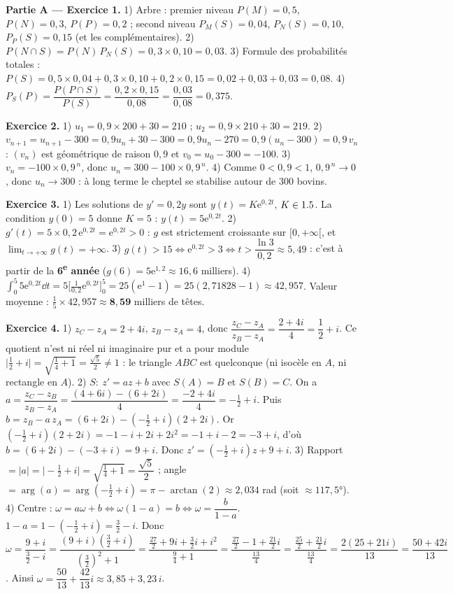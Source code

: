 
\noindent\textbf{Partie A — Exercice 1.}
1) Arbre : premier niveau $P(M)=0{,}5$, $P(N)=0{,}3$, $P(P)=0{,}2$ ; second niveau
$P_M(S)=0{,}04$, $P_N(S)=0{,}10$, $P_P(S)=0{,}15$ (et les complémentaires).
2) $P(N\cap S)=P(N)\,P_N(S)=0{,}3\times0{,}10=0{,}03$.
3) Formule des probabilités totales :
$P(S)=0{,}5\times0{,}04+0{,}3\times0{,}10+0{,}2\times0{,}15=0{,}02+0{,}03+0{,}03=0{,}08$.
4) $P_S(P)=\dfrac{P(P\cap S)}{P(S)}=\dfrac{0{,}2\times0{,}15}{0{,}08}=\dfrac{0{,}03}{0{,}08}=0{,}375$.

\noindent\textbf{Exercice 2.}
1) $u_1=0{,}9\times200+30=210$ ; $u_2=0{,}9\times210+30=219$.
2) $v_{n+1}=u_{n+1}-300=0{,}9u_n+30-300=0{,}9u_n-270=0{,}9(u_n-300)=0{,}9\,v_n$ :
$(v_n)$ est géométrique de raison $0{,}9$ et $v_0=u_0-300=-100$.
3) $v_n=-100\times0{,}9^{\,n}$, donc $u_n=300-100\times0{,}9^{\,n}$.
4) Comme $0<0{,}9<1$, $0{,}9^{\,n}\to0$, donc $u_n\to300$ : à long terme le cheptel se
stabilise autour de $300$ bovins.

\noindent\textbf{Exercice 3.}
1) Les solutions de $y'=0{,}2y$ sont $y(t)=K\mathrm{e}^{0{,}2t}$, $K\in1.5$. La condition
$y(0)=5$ donne $K=5$ : $y(t)=5\mathrm{e}^{0{,}2t}$.
2) $g'(t)=5\times0{,}2\,\mathrm{e}^{0{,}2t}=\mathrm{e}^{0{,}2t}>0$ : $g$ est strictement
croissante sur $[0,+\infty[$, et $\lim_{t\to+\infty}g(t)=+\infty$.
3) $g(t)>15 \iff \mathrm{e}^{0{,}2t}>3 \iff t>\dfrac{\ln 3}{0{,}2}\approx5{,}49$ : c'est à
partir de la \textbf{6\textsuperscript{e} année} ($g(6)=5\mathrm{e}^{1{,}2}\approx16{,}6$ milliers).
4) $\int_0^5 5\mathrm{e}^{0{,}2t}\dd t=5\big[\tfrac{1}{0{,}2}\mathrm{e}^{0{,}2t}\big]_0^5
=25(\mathrm{e}^{1}-1)=25(2{,}71828-1)\approx42{,}957$. Valeur moyenne :
$\tfrac15\times42{,}957\approx\mathbf{8{,}59}$ milliers de têtes.

\noindent\textbf{Exercice 4.}
1) $z_C-z_A=2+4i$, $z_B-z_A=4$, donc $\dfrac{z_C-z_A}{z_B-z_A}=\dfrac{2+4i}{4}=\dfrac12+i$.
Ce quotient n'est ni réel ni imaginaire pur et a pour module
$\big|\tfrac12+i\big|=\sqrt{\tfrac14+1}=\tfrac{\sqrt5}{2}\neq1$ : le triangle $ABC$ est
quelconque (ni isocèle en $A$, ni rectangle en $A$).
2) $S:\ z'=az+b$ avec $S(A)=B$ et $S(B)=C$. On a
$a=\dfrac{z_C-z_B}{z_B-z_A}=\dfrac{(4+6i)-(6+2i)}{4}=\dfrac{-2+4i}{4}=-\tfrac12+i$.
Puis $b=z_B-a\,z_A=(6+2i)-(-\tfrac12+i)(2+2i)$. Or $(-\tfrac12+i)(2+2i)=-1-i+2i+2i^2=-1+i-2=-3+i$,
d'où $b=(6+2i)-(-3+i)=9+i$. Donc $z'=(-\tfrac12+i)z+9+i$.
3) Rapport $=|a|=\big|-\tfrac12+i\big|=\sqrt{\tfrac14+1}=\dfrac{\sqrt5}{2}$ ;
angle $=\arg(a)=\arg(-\tfrac12+i)=\pi-\arctan(2)\approx2{,}034$ rad (soit $\approx117{,}5°$).
4) Centre : $\omega=a\omega+b \iff \omega(1-a)=b \iff \omega=\dfrac{b}{1-a}$.
$1-a=1-(-\tfrac12+i)=\tfrac32-i$. Donc
$\omega=\dfrac{9+i}{\tfrac32-i}=\dfrac{(9+i)(\tfrac32+i)}{(\tfrac32)^2+1}
=\dfrac{\tfrac{27}{2}+9i+\tfrac32 i+i^2}{\tfrac94+1}
=\dfrac{\tfrac{27}{2}-1+\tfrac{21}{2}i}{\tfrac{13}{4}}
=\dfrac{\tfrac{25}{2}+\tfrac{21}{2}i}{\tfrac{13}{4}}=\dfrac{2(25+21i)}{13}=\dfrac{50+42i}{13}$.
Ainsi $\omega=\dfrac{50}{13}+\dfrac{42}{13}i\approx3{,}85+3{,}23\,i$.

